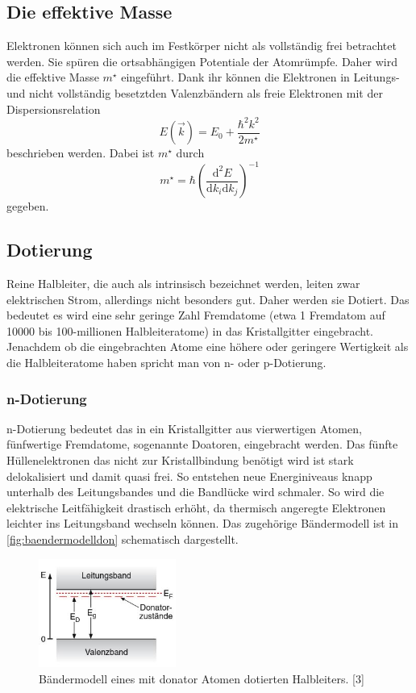\subsection{Die effektive Masse}
\label{sec:effektiveMasse}
Elektronen können sich auch im Festkörper nicht als vollständig frei betrachtet werden. Sie spüren die 
ortsabhängigen Potentiale der Atomrümpfe. Daher wird die effektive Masse $m^{\star}$ eingeführt. 
Dank ihr können die Elektronen in Leitungs- und nicht vollständig besetztden Valenzbändern als freie Elektronen
mit der Dispersionsrelation
\begin{equation}
  \label{eq:dispersionsrelation}
  E(\vec{k})=E_0+\frac{\hbar^2k^2}{2m^{\star}}
\end{equation}
beschrieben werden. Dabei ist $m^{\star}$ durch 
\begin{equation*}
  m^{\star}=\hbar(\frac{\mathrm{d}^2E}{\mathrm{d}k_i\mathrm{d}k_j})^{-1}
\end{equation*}
gegeben.


\subsection{Dotierung}
\label{sec:dotierung}
Reine Halbleiter, die auch als intrinsisch bezeichnet werden, leiten zwar elektrischen Strom, allerdings nicht
besonders gut. Daher werden sie Dotiert. Das bedeutet es wird eine sehr geringe Zahl Fremdatome (etwa 1 
Fremdatom auf 10000 bis 100-millionen Halbleiteratome) in das Kristallgitter eingebracht. Jenachdem ob die 
eingebrachten Atome eine höhere oder geringere Wertigkeit als die Halbleiteratome haben spricht man von 
n- oder p-Dotierung.
\subsubsection{n-Dotierung}
\label{sec:ndotierung}
n-Dotierung bedeutet das in ein Kristallgitter aus vierwertigen Atomen, fünfwertige Fremdatome,
sogenannte Doatoren, eingebracht werden. Das fünfte Hüllenelektronen das nicht zur Kristallbindung
benötigt wird ist stark delokalisiert und damit quasi frei. So entstehen neue Energiniveaus knapp unterhalb
des Leitungsbandes und die Bandlücke wird schmaler. So wird die elektrische Leitfähigkeit drastisch erhöht, 
da thermisch angeregte Elektronen leichter ins Leitungsband wechseln können. Das zugehörige Bändermodell
ist in \autoref{fig:baendermodelldon} schematisch dargestellt.
\begin{figure}
  \centering
  \includegraphics[width=0.4\textwidth]{content/grafiken/donatoren.JPG}
  \caption{Bändermodell eines mit donator Atomen dotierten Halbleiters. [3]}
  \label{fig:baendermodelldon}
\end{figure}
\FloatBarrier
